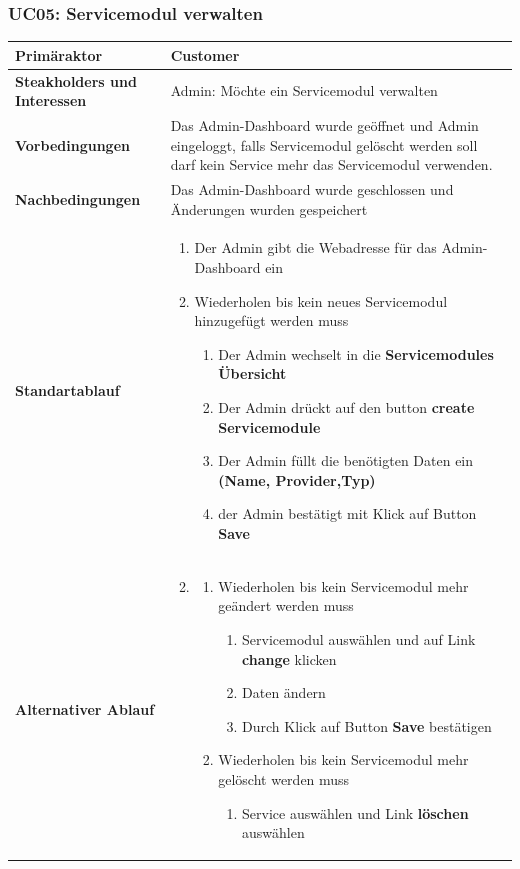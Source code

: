 \documentclass[11pt]{scrartcl}
\begin{document}
\subsubsection{UC05: Servicemodul verwalten}
\begin{longtabu} to \textwidth {X[1,l] X[2,l]}
	\bfseries Primäraktor & Customer  \\\hline 
	\bfseries Steakholders und Interessen & Admin: Möchte ein Servicemodul verwalten  \\\hline 
	\bfseries Vorbedingungen & Das Admin-Dashboard wurde geöffnet und Admin eingeloggt, 
	falls Servicemodul gelöscht werden soll darf kein Service mehr das Servicemodul verwenden. \\\hline 
	\bfseries Nachbedingungen & Das Admin-Dashboard wurde geschlossen und 
	Änderungen wurden gespeichert \\\hline 
	\bfseries Standartablauf & 
	\begin{enumerate}
			\item Der Admin gibt die Webadresse für das Admin-Dashboard ein
			\item Wiederholen bis kein neues Servicemodul hinzugefügt werden muss
			\begin{enumerate}
			  \item Der Admin wechselt in die \textbf{Servicemodules Übersicht}
			  \item Der Admin drückt auf den button \textbf{create Servicemodule}
			  \item Der Admin füllt die benötigten Daten ein \textbf{(Name, Provider,Typ)}
			  \item der Admin bestätigt mit Klick auf Button \textbf{Save}
			\end{enumerate}
		\end{enumerate}
      \\\hline
      \bfseries Alternativer Ablauf & 
      \begin{enumerate}
        \setcounter{enumi}{1}
        \item 
        \begin{enumerate}
          \item Wiederholen bis kein Servicemodul mehr geändert werden muss
            \begin{enumerate}
              \item Servicemodul auswählen und auf Link \textbf{change} klicken
              \item Daten ändern
              \item Durch Klick auf Button \textbf{Save} bestätigen
            \end{enumerate}
            \item Wiederholen bis kein Servicemodul mehr gelöscht werden muss
            \begin{enumerate}
              \item Service auswählen und Link \textbf{löschen} auswählen
            \end{enumerate}
        \end{enumerate}
      \end{enumerate}
      \\\hline


\end{longtabu}
\end{document}
